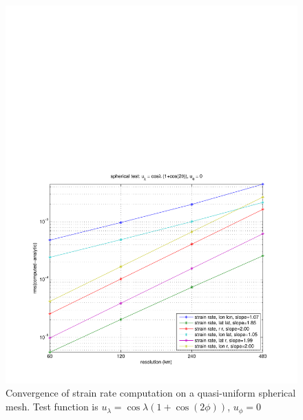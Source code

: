 \documentclass[11pt]{report}
\begin{document}
\begin{figure}[htbp]
 \center
 \includegraphics[scale=0.8, trim = 0 0 0 4in, clip]{f/a19_sph_conv_test_1.pdf}
 \caption{Convergence of strain rate computation on a quasi-uniform spherical mesh.  Test function is $u_{\lambda}=\cos \lambda (1+\cos(2\phi))$, $u_{\phi}=0$}
 \label{fig:convergence1}
\end{figure}
\end{document}
